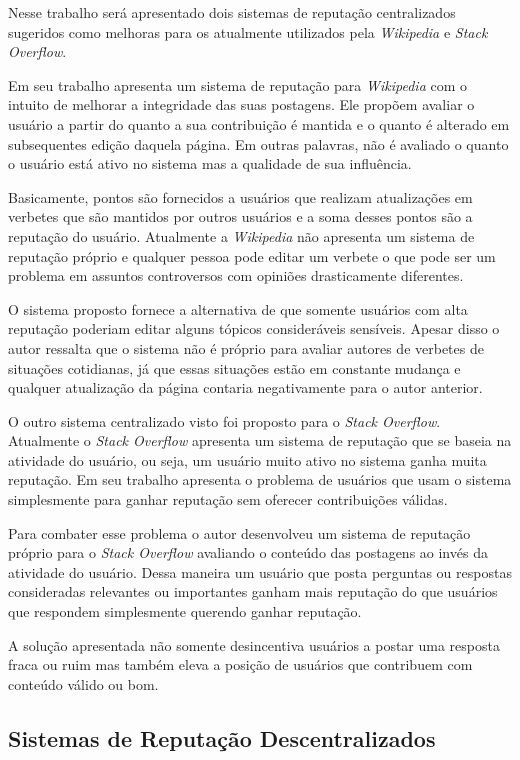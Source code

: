 \documentclass[12pt]{article}
\begin{document}
Nesse trabalho será apresentado dois sistemas de reputação centralizados sugeridos como melhoras para os atualmente utilizados pela \emph{Wikipedia} e \emph{Stack Overflow}.

Em seu trabalho \cite{adler2007content} apresenta um sistema de reputação para \emph{Wikipedia} com o intuito de melhorar a integridade das suas postagens. Ele propõem avaliar o usuário a partir do quanto a sua contribuição é mantida e o quanto é alterado em subsequentes edição daquela página. Em outras palavras, não é avaliado o quanto o usuário está ativo no sistema mas a qualidade de sua influência. 

Basicamente, pontos são fornecidos a usuários que realizam atualizações em verbetes que são mantidos por outros usuários e a soma desses pontos são a reputação do usuário. Atualmente a \emph{Wikipedia} não apresenta um sistema de reputação próprio e qualquer pessoa pode editar um verbete o que pode ser um problema em assuntos controversos com opiniões drasticamente diferentes.

O sistema proposto fornece a alternativa de que somente usuários com alta reputação poderiam editar alguns tópicos consideráveis sensíveis. Apesar disso o autor ressalta que o sistema não é próprio para avaliar autores de verbetes de situações cotidianas, já que essas situações estão em constante mudança e qualquer atualização da página contaria negativamente para o autor anterior.

O outro sistema centralizado visto foi proposto para o \emph{Stack Overflow}. Atualmente o \emph{Stack Overflow} apresenta um sistema de reputação que se baseia na atividade do usuário, ou seja, um usuário muito ativo no sistema ganha muita reputação. Em seu trabalho \cite{huna2016exploiting} apresenta o problema de usuários que usam o sistema simplesmente para ganhar reputação sem oferecer contribuições válidas.

Para combater esse problema o autor desenvolveu um sistema de reputação próprio para o \emph{Stack Overflow} avaliando o conteúdo das postagens ao invés da atividade do usuário. Dessa maneira um usuário que posta perguntas ou respostas consideradas relevantes ou importantes ganham mais reputação do que usuários que respondem simplesmente querendo ganhar reputação.

A solução apresentada não somente desincentiva usuários a postar uma resposta fraca ou ruim mas também eleva a posição de usuários que contribuem com conteúdo válido ou bom.

\subsection{Sistemas de Reputação Descentralizados} \label{subsec:SRDescen}
\end{document}
